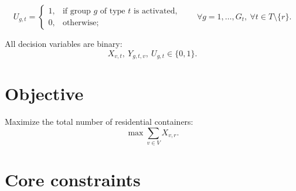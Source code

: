 \documentclass[12pt,a4paper]{article}
\begin{document}
\[
U_{g,t} =
\begin{cases}
1, & \text{if group $g$ of type $t$ is activated,}\\[3pt]
0, & \text{otherwise;}
\end{cases}
\qquad \forall g = 1,\dots,G_t,\ \forall t \in T \setminus \{r\}.
\]

All decision variables are binary:
\[
X_{v,t},\ Y_{g,t,v},\ U_{g,t} \in \{0,1\}.
\]

\section{Objective}

Maximize the total number of residential containers:
\[
\max \sum_{v \in V} X_{v,r}.
\]

\section{Core constraints}
\end{document}
